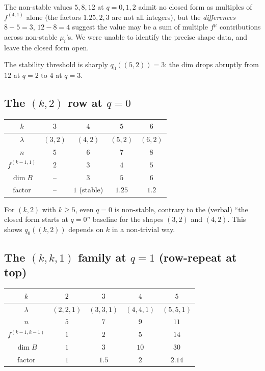 \documentclass[11pt]{article}
\theoremstyle{definition}
\begin{document}
The non-stable values $5, 8, 12$ at $q = 0, 1, 2$ admit no closed form
as multiples of $f^{(4,1)}$ alone (the factors $1.25, 2, 3$ are not all
integers), but the \emph{differences} $8 - 5 = 3$, $12 - 8 = 4$
suggest the value may be a sum of multiple $f^\mu$ contributions
across non-stable $\mu_i$'s.  We were unable to identify the precise
shape data, and leave the closed form open.

The stability threshold is sharply $q_0((5, 2)) = 3$: the dim drops
abruptly from $12$ at $q = 2$ to $4$ at $q = 3$.

\subsection{The $(k, 2)$ row at $q = 0$}

\begin{center}
\begin{tabular}{c|cccc}
\toprule
$k$        & $3$ & $4$ & $5$ & $6$ \\
\midrule
$\lambda$  & $(3, 2)$ & $(4, 2)$ & $(5, 2)$ & $(6, 2)$ \\
$n$        & $5$       & $6$       & $7$       & $8$       \\
$f^{(k-1, 1)}$ & $2$   & $3$       & $4$       & $5$       \\
$\dim B$   & --       & $3$       & $5$       & $6$       \\
factor     & --       & $1$ (stable) & $1.25$   & $1.2$     \\
\bottomrule
\end{tabular}
\end{center}

For $(k, 2)$ with $k \ge 5$, even $q = 0$ is non-stable, contrary to
the (verbal) ``the closed form starts at $q = 0$'' baseline for the
shapes $(3, 2)$ and $(4, 2)$.  This shows $q_0((k, 2))$ depends on
$k$ in a non-trivial way.

\subsection{The $(k, k, 1)$ family at $q = 1$ (row-repeat at top)}

\begin{center}
\begin{tabular}{c|cccc}
\toprule
$k$         & $2$ & $3$ & $4$ & $5$ \\
\midrule
$\lambda$   & $(2,2,1)$ & $(3,3,1)$ & $(4,4,1)$ & $(5,5,1)$ \\
$n$         & $5$       & $7$       & $9$       & $11$ \\
$f^{(k-1, k-1)}$ & $1$  & $2$       & $5$       & $14$ \\
$\dim B$    & $1$       & $3$       & $10$      & $30$ \\
factor      & $1$       & $1.5$     & $2$       & $2.14$ \\
\bottomrule
\end{tabular}
\end{center}
\end{document}
